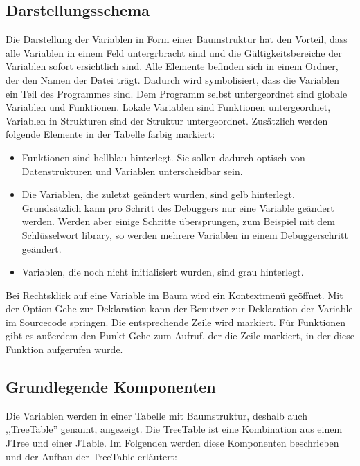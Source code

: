 \subsection{Darstellungsschema}

Die Darstellung der Variablen in Form einer Baumstruktur hat den Vorteil, dass alle Variablen in einem Feld untergrbracht sind und die Gültigkeitsbereiche der Variablen sofort ersichtlich sind.
Alle Elemente befinden sich in einem Ordner, der den Namen der Datei trägt. Dadurch wird symbolisiert, dass die Variablen ein Teil des Programmes sind. Dem Programm selbst untergeordnet sind globale Variablen und Funktionen. Lokale Variablen sind Funktionen untergeordnet, Variablen in Strukturen sind der Struktur untergeordnet.
Zusätzlich werden folgende Elemente in der Tabelle farbig markiert:
\begin{itemize}
\item Funktionen sind hellblau hinterlegt. Sie sollen dadurch optisch von Datenstrukturen und Variablen unterscheidbar sein.
\item Die Variablen, die zuletzt geändert wurden, sind gelb hinterlegt. Grundsätzlich kann pro Schritt des Debuggers nur eine Variable geändert werden. Werden aber einige Schritte übersprungen, zum Beispiel mit dem Schlüsselwort \glqq library\grqq, so werden mehrere Variablen in einem Debuggerschritt geändert.
\item Variablen, die noch nicht initialisiert wurden, sind grau hinterlegt.
\end{itemize}

Bei Rechtsklick auf eine Variable im Baum wird ein Kontextmenü geöffnet. Mit der Option \glqq{}Gehe zur Deklaration\grqq{} kann der Benutzer zur Deklaration der Variable im Sourcecode springen. Die entsprechende Zeile wird markiert. Für Funktionen gibt es außerdem den Punkt \glqq{}Gehe zum Aufruf\grqq{}, der die Zeile markiert, in der diese Funktion aufgerufen wurde.

\subsection{Grundlegende Komponenten}
Die Variablen werden in einer Tabelle mit Baumstruktur, deshalb auch ,,TreeTable'' genannt, angezeigt. Die TreeTable ist eine Kombination aus einem JTree und einer JTable.
Im Folgenden werden diese Komponenten beschrieben und der Aufbau der TreeTable erläutert:

